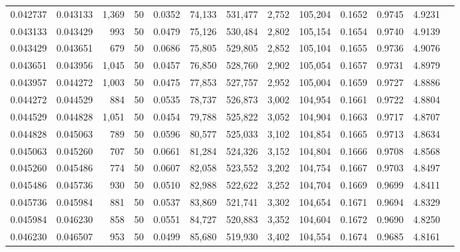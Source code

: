 \begin{tabular}{rrrrrrrrrrrrr}
0.042737 & 0.043133 & 1,369 &  50 &                                     0.0352 &  74,133 & 531,477 &   2,752 & 105,204 & 0.1652 & 0.9745 & 4.9231 \\
0.043133 & 0.043429 &   993 &  50 &                                     0.0479 &  75,126 & 530,484 &   2,802 & 105,154 & 0.1654 & 0.9740 & 4.9139 \\
0.043429 & 0.043651 &   679 &  50 &                                     0.0686 &  75,805 & 529,805 &   2,852 & 105,104 & 0.1655 & 0.9736 & 4.9076 \\
0.043651 & 0.043956 & 1,045 &  50 &                                     0.0457 &  76,850 & 528,760 &   2,902 & 105,054 & 0.1657 & 0.9731 & 4.8979 \\
0.043957 & 0.044272 & 1,003 &  50 &                                     0.0475 &  77,853 & 527,757 &   2,952 & 105,004 & 0.1659 & 0.9727 & 4.8886 \\
0.044272 & 0.044529 &   884 &  50 &                                     0.0535 &  78,737 & 526,873 &   3,002 & 104,954 & 0.1661 & 0.9722 & 4.8804 \\
0.044529 & 0.044828 & 1,051 &  50 &                                     0.0454 &  79,788 & 525,822 &   3,052 & 104,904 & 0.1663 & 0.9717 & 4.8707 \\
0.044828 & 0.045063 &   789 &  50 &                                     0.0596 &  80,577 & 525,033 &   3,102 & 104,854 & 0.1665 & 0.9713 & 4.8634 \\
0.045063 & 0.045260 &   707 &  50 &                                     0.0661 &  81,284 & 524,326 &   3,152 & 104,804 & 0.1666 & 0.9708 & 4.8568 \\
0.045260 & 0.045486 &   774 &  50 &                                     0.0607 &  82,058 & 523,552 &   3,202 & 104,754 & 0.1667 & 0.9703 & 4.8497 \\
0.045486 & 0.045736 &   930 &  50 &                                     0.0510 &  82,988 & 522,622 &   3,252 & 104,704 & 0.1669 & 0.9699 & 4.8411 \\
0.045736 & 0.045984 &   881 &  50 &                                     0.0537 &  83,869 & 521,741 &   3,302 & 104,654 & 0.1671 & 0.9694 & 4.8329 \\
0.045984 & 0.046230 &   858 &  50 &                                     0.0551 &  84,727 & 520,883 &   3,352 & 104,604 & 0.1672 & 0.9690 & 4.8250 \\
0.046230 & 0.046507 &   953 &  50 &                                     0.0499 &  85,680 & 519,930 &   3,402 & 104,554 & 0.1674 & 0.9685 & 4.8161 \\

\end{tabular}
